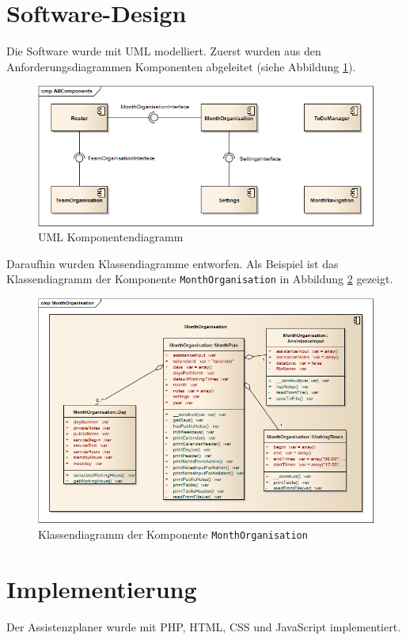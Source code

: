 \section*{Software-Design}
Die Software wurde mit UML modelliert. Zuerst wurden aus den Anforderungsdiagrammen Komponenten abgeleitet (siehe Abbildung \ref{fig:UMLKomponentendiagramm}).\\[1ex]

\begin{figure}[H]
\centering
	\includegraphics[width=1.0\textwidth]{../Images/Modell/UMLAllComponents.png}
	\caption[UML Komponentendiagramm]{UML Komponentendiagramm}
	\label{fig:UMLKomponentendiagramm}
\end{figure}

Daraufhin wurden Klassendiagramme entworfen. Als Beispiel ist das Klassendiagramm der Komponente \texttt{MonthOrganisation} in Abbildung \ref{fig:UMLComponentMonthOrganisation} gezeigt.\\[1ex]

\begin{figure}[H]
	\centering
	\includegraphics[width=1.0\textwidth]{../Images/Modell/UMLComponentMonthOrganisation.png}
	\caption{Klassendiagramm der Komponente \texttt{MonthOrganisation}}
	\label{fig:UMLComponentMonthOrganisation}
\end{figure}

\section*{Implementierung}
Der Assistenzplaner wurde mit PHP, HTML, CSS und JavaScript implementiert.